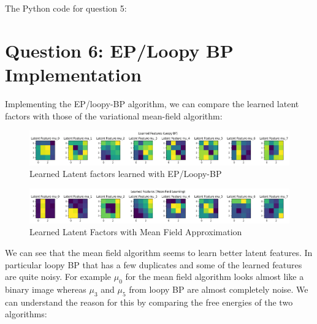 \documentclass[12pt]{article}
\begin{document}
\newpage
The Python code for question 5:



\newpage
\section*{Question 6: EP/Loopy BP Implementation}

Implementing the EP/loopy-BP algorithm, we can compare the learned latent factors with those of the variational mean-field algorithm:

\begin{figure}[h]
\centering
\includegraphics[scale=0.4]{outputs/q6/all-latent-factors}
\caption{Learned Latent factors learned with EP/Loopy-BP}
\label{fig:6-latent-factors}
\end{figure}

\begin{figure}[h]
\centering
\includegraphics[scale=0.4]{outputs/q3/f-latent-factors}
\caption{Learned Latent Factors with Mean Field Approximation}
\label{fig:3f-latent-factors}
\end{figure}

We can see that the mean field algorithm seems to learn better latent features. In particular loopy BP that has a few duplicates and some of the learned features are quite noisy. For example $\mu_0$ for the mean field algorithm looks almost like a binary image whereas $\mu_3$ and $\mu_5$ from loopy BP are almost completely noise. We can understand the reason for this by comparing the free energies of the two algorithms:
\end{document}
